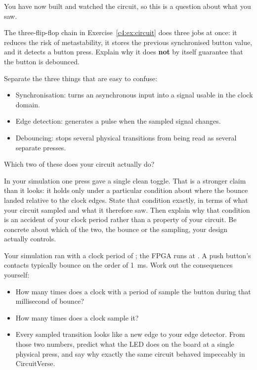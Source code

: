 
\label{c4:ex:debounce}
You have now built and watched the circuit, so this is a question about what you saw.

The three-flip-flop chain in Exercise~\ref{c4:ex:circuit} does three jobs at once: it reduces the
risk of metastability, it stores the previous synchronised button value, and it detects a button
press. Explain why it does \textbf{not} by itself guarantee that the button is debounced.

 Separate the three things that are easy to confuse:
\begin{itemize}
  \item Synchronisation: turns an asynchronous input into a signal usable in the clock domain.
  \item Edge detection: generates a pulse when the sampled signal changes.
  \item Debouncing: stops several physical transitions from being read as several separate presses.
\end{itemize}
Which two of these does your circuit actually do?

 In your simulation one press gave a single clean toggle. That is a stronger claim than it
looks: it holds only under a particular condition about where the bounce landed relative to the
clock edges. State that condition exactly, in terms of what your circuit sampled and what it
therefore saw. Then explain why that condition is an accident of your clock period rather than a
property of your circuit. Be concrete about which of the two, the bounce or the sampling, your
design actually controls.

 Your simulation ran with a clock period of ; the FPGA runs at .
A push button's contacts typically bounce on the order of 1~ms. Work out the consequences yourself:
\begin{itemize}
  \item How many times does a clock with a period of  sample the button during that
    millisecond of bounce?
  \item How many times does a  clock sample it?
  \item Every sampled transition looks like a new edge to your edge detector. From those two
    numbers, predict what the LED does on the board at a single physical press, and say why exactly
    the same circuit behaved impeccably in CircuitVerse.
\end{itemize}

